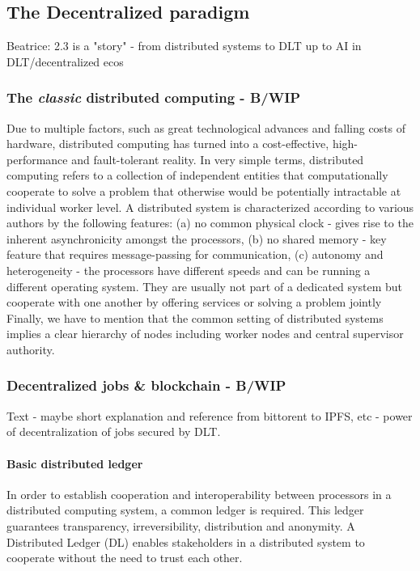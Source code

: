 \documentclass{article}
\begin{document}
\subsection{The Decentralized paradigm }

Beatrice: 2.3 is a "story" - from distributed systems to DLT up to AI in DLT/decentralized ecos

\subsubsection{The \textit{classic} distributed computing - B/WIP}
Due to multiple factors, such as great technological advances and falling costs of hardware, distributed computing has turned into a cost-effective, high-performance and fault-tolerant reality. In very simple terms, distributed computing refers to a collection of independent entities that computationally cooperate to solve a problem that otherwise would be potentially intractable at individual worker level. 
A distributed system is characterized according to various authors \cite{ajay2008distributed} by the following features: (a) no common physical clock - gives rise to the inherent asynchronicity amongst the processors, (b) no shared memory - key feature that requires message-passing for communication, (c) autonomy and heterogeneity - the processors have different speeds and can be running a different operating system. They are usually not part of a dedicated system but cooperate with one another by offering services or solving a problem jointly  
Finally, we have to mention that the common setting of distributed systems implies a clear hierarchy of nodes including worker nodes and central supervisor authority.

\subsubsection{Decentralized jobs \& blockchain - B/WIP}
Text - maybe short explanation and reference from bittorent to IPFS, etc - power of decentralization of jobs secured by DLT.
\paragraph{Basic distributed ledger}

In order to establish cooperation and interoperability between processors in a distributed computing system, a common ledger is required. This ledger guarantees transparency, irreversibility, distribution and anonymity. A Distributed Ledger (DL) enables stakeholders in a distributed system to cooperate without the need to trust each other. \cite{burkhardt2018ledger}
\end{document}
